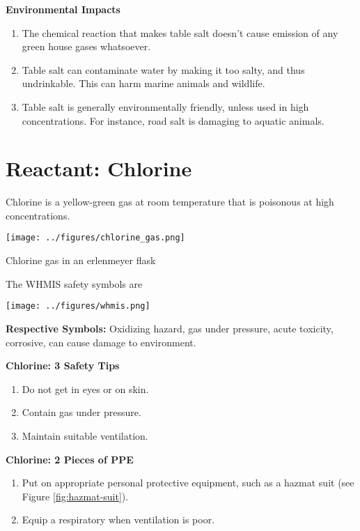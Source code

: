 \documentclass[working]{tuftebook}
\begin{document}
\textbf{Environmental Impacts}
\begin{enumerate}
    \item{The chemical reaction that makes table salt doesn't cause emission of any green house gases whatsoever.}
    \item{Table salt can contaminate water by making it too salty, and thus undrinkable. This can harm marine animals and wildlife.}
    \item{Table salt is generally environmentally friendly, unless used in high concentrations. For instance, road salt is damaging to aquatic animals.}
\end{enumerate}

\section*{Reactant: Chlorine}
Chlorine is a yellow-green gas at room temperature that is poisonous at high concentrations.

\begin{marginfigure}
    \centering
    \vspace{2em}
    \texttt{[image: ../figures/chlorine\_gas.png]}
    \caption{Chlorine gas in an erlenmeyer flask}
    \label{fig:chlorine}
\end{marginfigure}

\begin{whmis}
    The WHMIS safety symbols are 

    \centering
    \texttt{[image: ../figures/whmis.png]}
    
\end{whmis}

\textbf{Respective Symbols:} Oxidizing hazard, gas under pressure, acute toxicity, corrosive, can cause damage to environment. 
\vspace{2em}

\textbf{Chlorine: 3 Safety Tips}
\begin{enumerate}
    \item{Do not get in eyes or on skin.}
    \item{Contain gas under pressure.}
    \item{Maintain suitable ventilation.}
\end{enumerate}
\vspace{2em}

\textbf{Chlorine: 2 Pieces of PPE}
\begin{enumerate}
    \item{Put on appropriate personal protective equipment, such as a hazmat suit (see Figure \ref{fig:hazmat-suit}).}
    \item{Equip a respiratory when ventilation is poor.}
\end{enumerate}
\end{document}
